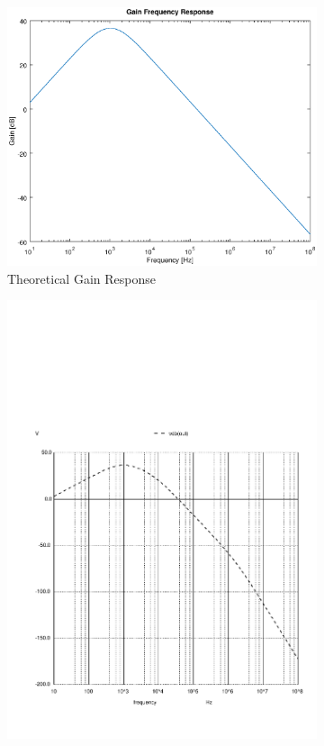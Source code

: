 \begin{figure}[h]
\centering
\begin{subfigure}{.5\textwidth}
    \centering
    \vspace{2.8 cm}
    \includegraphics[scale=0.4]{theo_gain_f_response.eps}
    \caption{Theoretical Gain Response}
\end{subfigure}%
\begin{subfigure}{.5\textwidth}
    \centering
    \includegraphics[scale=0.33]{vodb.pdf}

\end{subfigure}
\end{figure}
